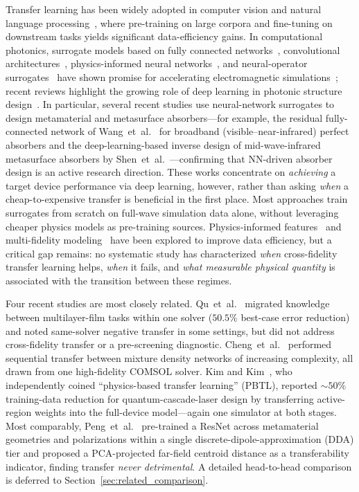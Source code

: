 \documentclass[a4paper,fleqn]{cas-sc}
\begin{document}
Transfer learning has been widely adopted in computer vision and natural language processing~\cite{pan2010survey,zhuang2021comprehensive}, where pre-training on large corpora and fine-tuning on downstream tasks yields significant data-efficiency gains. In computational photonics, surrogate models based on fully connected networks~\cite{so2020deep}, convolutional architectures~\cite{liu2018training,malkiel2018plasmonic}, physics-informed neural networks~\cite{raissi2019physics}, and neural-operator surrogates~\cite{lu2021deeponet} have shown promise for accelerating electromagnetic simulations~\cite{ma2021deep,jiang2021deep}; recent reviews highlight the growing role of deep learning in photonic structure design~\cite{wiecha2021deep,khatib2022deep,an2019deep,wiecha2024newcomer}. In particular, several recent studies use neural-network surrogates to design metamaterial and metasurface absorbers---for example, the residual fully-connected network of Wang~et~al.~\cite{wang2023innovative} for broadband (visible--near-infrared) perfect absorbers and the deep-learning-based inverse design of mid-wave-infrared metasurface absorbers by Shen~et~al.~\cite{shen2025design}---confirming that NN-driven absorber design is an active research direction. These works concentrate on \emph{achieving} a target device performance via deep learning, however, rather than asking \emph{when} a cheap-to-expensive transfer is beneficial in the first place. Most approaches train surrogates from scratch on full-wave simulation data alone, without leveraging cheaper physics models as pre-training sources. Physics-informed features~\cite{chen2019smart} and multi-fidelity modeling~\cite{peherstorfer2018survey,kennedy2000predicting,fernandez2016review,forrester2007multi} have been explored to improve data efficiency, but a critical gap remains: no systematic study has characterized \emph{when} cross-fidelity transfer learning helps, \emph{when} it fails, and \emph{what measurable physical quantity} is associated with the transition between these regimes.

Four recent studies are most closely related. Qu~et~al.~\cite{qu2019migrating} migrated knowledge between multilayer-film tasks within one solver ($50.5\%$ best-case error reduction) and noted same-solver negative transfer in some settings, but did not address cross-fidelity transfer or a pre-screening diagnostic. Cheng~et~al.~\cite{chen2024tl_mdn} performed sequential transfer between mixture density networks of increasing complexity, all drawn from one high-fidelity COMSOL solver. Kim and Kim~\cite{kim2025pbtl}, who independently coined ``physics-based transfer learning'' (PBTL), reported ${\sim}50\%$ training-data reduction for quantum-cascade-laser design by transferring active-region weights into the full-device model---again one simulator at both stages. Most comparably, Peng~et~al.~\cite{peng2024nanophotonics} pre-trained a ResNet across metamaterial geometries and polarizations within a single discrete-dipole-approximation (DDA) tier and proposed a PCA-projected far-field centroid distance as a transferability indicator, finding transfer \emph{never detrimental}. A detailed head-to-head comparison is deferred to Section~\ref{sec:related_comparison}.
\end{document}
